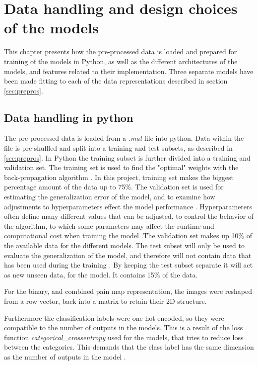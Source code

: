 \section{Data handling and design choices of the models}
This chapter presents how the pre-processed data is loaded and prepared for training of the models in Python, as well as the different architectures of the models, and features related to their implementation. Three separate models have been made fitting to each of the data representations described in section \ref{sec:prepros}. 

\subsection{Data handling in python}
The pre-processed data is loaded from a \textit{.mat} file into python.
Data within the file is pre-shuffled and split into a training and test subsets, as described in \autoref{sec:prepros}. 
In Python the training subset is further divided into a training and validation set. 
The training set is used to find the "optimal" weights with the back-propagation algorithm \citep{Bengio2012}. In this project, training set makes the biggest percentage amount of the data up to 75\%.
The validation set is used for estimating the generalization error of the model, and to examine how adjustments to hyperparameters effect the model performance \citep{Duda2000}. Hyperparameters often define many different values that can be adjusted, to control the behavior of the algorithm, to which some parameters may affect the runtime and computational cost when training the model \citep{Goodfellow2016}.The validation set makes up 10\% of the available data for the different models.
The test subset will only be used to evaluate the generalization of the model, and therefore will not contain data that has been used during the training \citep{Duda2000}.
By keeping the test subset separate it will act as new unseen data, for the model. It contains 15\% of the data.

For the binary, and combined pain map representation, the images were reshaped from a row vector, back into a matrix to retain their 2D structure. 

Furthermore the classification labels were one-hot encoded, so they were compatible to the number of outputs in the models. This is a result of the loss function \textit{categorical\_crossentropy} used for the models, that tries to reduce loss between the categories. This demands that the class label has the same dimension as the number of outputs in the model \citep{Chollet2015}.    

